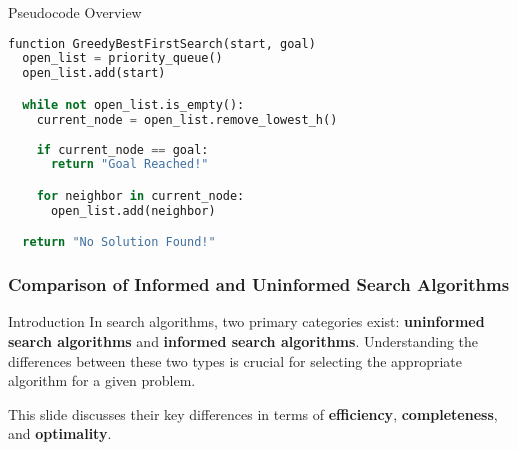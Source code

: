 \documentclass[aspectratio=169]{beamer}
\begin{document}
\begin{frame}[fragile]{Pseudocode Overview}
    \begin{lstlisting}[language=Python]
function GreedyBestFirstSearch(start, goal)
  open_list = priority_queue()
  open_list.add(start)

  while not open_list.is_empty():
    current_node = open_list.remove_lowest_h() 
    
    if current_node == goal:
      return "Goal Reached!"

    for neighbor in current_node:
      open_list.add(neighbor)

  return "No Solution Found!"
    \end{lstlisting}
\end{frame}

\begin{frame}[fragile]
    \frametitle{Comparison of Informed and Uninformed Search Algorithms}
    \begin{block}{Introduction}
        In search algorithms, two primary categories exist: \textbf{uninformed search algorithms} and \textbf{informed search algorithms}. Understanding the differences between these two types is crucial for selecting the appropriate algorithm for a given problem. 
    \end{block}
    
    This slide discusses their key differences in terms of \textbf{efficiency}, \textbf{completeness}, and \textbf{optimality}.
\end{frame}
\end{document}
